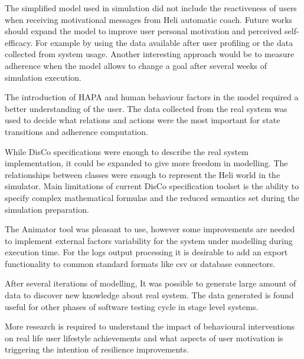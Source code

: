 \documentclass{llncs}
\begin{document}
The simplified model used in simulation did not include the reactiveness of users when receiving motivational messages from Heli automatic coach. Future works should expand the model to improve user personal motivation and perceived self-efficacy. For example by using the data available after user profiling or the data collected from system usage.  Another interesting approach would be to measure adherence when the model allows to change a goal after several weeks of simulation execution.

The introduction of  HAPA and human behaviour factors in the model required a better understanding of the user. The data collected from the real system was used to decide what relations and actions were the most important for state transitions and adherence computation.

While DisCo specifications were enough to describe the real system implementation, it could be expanded to give more freedom in modelling. The relationships between classes were enough to represent the Heli world in the simulator. Main limitations of current DisCo specification toolset is the ability to specify complex mathematical formulas and the reduced semantics set during the simulation preparation. 

The Animator tool was pleasant to use, however some improvements are needed to implement  external factors variability for the system under modelling during execution time. For the logs output processing it is desirable to add an export functionality to common standard formats like csv or database connectors.

After several iterations of modelling, It was possible to generate large amount of data to discover new knowledge about real system. The data generated is found useful for other phases of software testing cycle in stage level systems. 

More research is required to understand the impact of behavioural interventions on real life user lifestyle achievements and what aspects of user motivation is triggering the intention of resilience improvements.
 
\end{document}

